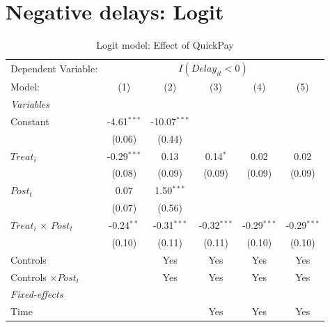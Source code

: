 \documentclass[
]{article}
\begin{document}
\hypertarget{negative-delays-logit}{%
\section{Negative delays: Logit}\label{negative-delays-logit}}

\begin{table}[htbp]
   \caption{Logit model: Effect of QuickPay}
   \centering
   \begin{tabular}{lccccc}
      \tabularnewline \midrule \midrule
      Dependent Variable: & \multicolumn{5}{c}{$I(Delay_{it}<0)$}\\
      Model:                       & (1)           & (2)            & (3)           & (4)           & (5)\\  
      \midrule
      \emph{Variables}\\
      Constant                     & -4.61$^{***}$ & -10.07$^{***}$ &               &               &   \\   
                                   & (0.06)        & (0.44)         &               &               &   \\   
      $Treat_i$                    & -0.29$^{***}$ & 0.13           & 0.14$^{*}$    & 0.02          & 0.02\\   
                                   & (0.08)        & (0.09)         & (0.09)        & (0.09)        & (0.09)\\   
      $Post_t$                     & 0.07          & 1.50$^{***}$   &               &               &   \\   
                                   & (0.07)        & (0.56)         &               &               &   \\   
      $Treat_i$ $\times$ $Post_t$  & -0.24$^{**}$  & -0.31$^{***}$  & -0.32$^{***}$ & -0.29$^{***}$ & -0.29$^{***}$\\   
                                   & (0.10)        & (0.11)         & (0.11)        & (0.10)        & (0.10)\\   
      Controls                     &               & Yes            & Yes           & Yes           & Yes\\  
      Controls $\times Post_t$     &               & Yes            & Yes           & Yes           & Yes\\  
      \midrule
      \emph{Fixed-effects}\\
      Time                         &               &                & Yes           & Yes           & Yes\\  

\end{tabular}
\end{table}
\end{document}
